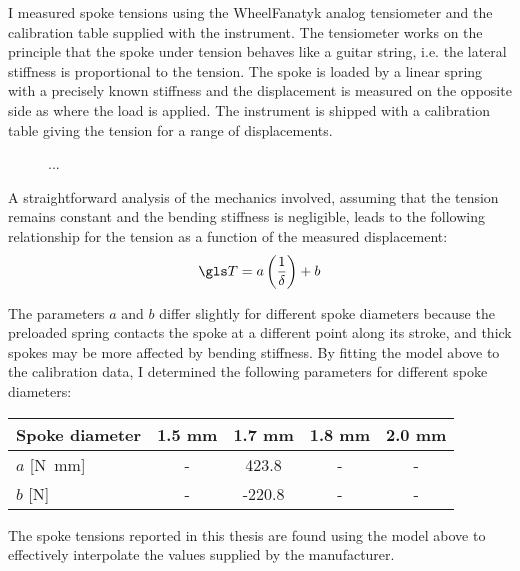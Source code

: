 \documentclass[../../thesis.tex]{subfiles}
\begin{document}
I measured spoke tensions using the WheelFanatyk analog tensiometer and the calibration table supplied with the instrument. The tensiometer works on the principle that the spoke under tension behaves like a guitar string, i.e. the lateral stiffness is proportional to the tension. The spoke is loaded by a linear spring with a precisely known stiffness and the displacement is measured on the opposite side as where the load is applied. The instrument is shipped with a calibration table giving the tension for a range of displacements.

\begin{figure}
\caption{...}
\label{fig:tensiometer_calibration}
\end{figure}

A straightforward analysis of the mechanics involved, assuming that the tension remains constant and the bending stiffness is negligible, leads to the following relationship for the tension as a function of the measured displacement:
\begin{equation}
\T = a\left(\frac{1}{\delta}\right) + b
\end{equation}

The parameters $a$ and $b$ differ slightly for different spoke diameters because the preloaded spring contacts the spoke at a different point along its stroke, and thick spokes may be more affected by bending stiffness. By fitting the model above to the calibration data, I determined the following parameters for different spoke diameters:

\begin{table}[h]
\begin{tabular}{l|cccc}
\hline
Spoke diameter & \bf 1.5 mm & \bf 1.7 mm & \bf 1.8 mm & \bf 2.0 mm\\
\hline
$a$ [\si{N.mm}]  & - &  423.8 & - & -\\
$b$ [\si{N}]     & - & -220.8 & - & -\\
\hline
\end{tabular}
\end{table}

The spoke tensions reported in this thesis are found using the model above to effectively interpolate the values supplied by the manufacturer.
\end{document}
